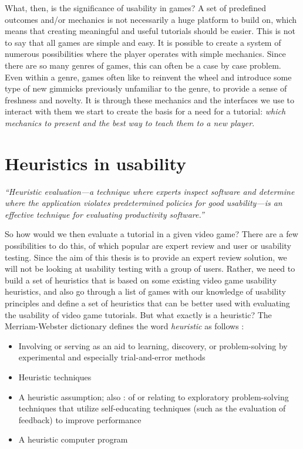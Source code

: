 What, then, is the significance of usability in games? A set of predefined outcomes and/or mechanics is not necessarily a huge platform to build on, which means that creating meaningful and useful tutorials should be easier. This is not to say that all games are simple and easy. It is possible to create a system of numerous possibilities where the player operates with simple mechanics. Since there are so many genres of games, this can often be a case by case problem. Even within a genre, games often like to reinvent the wheel and introduce some type of new gimmicks previously unfamiliar to the genre, to provide a sense of freshness and novelty. It is through these mechanics and the interfaces we use to interact with them we start to create the basis for a need for a tutorial: \textit{which mechanics to present and the best way to teach them to a new player}.

\section{Heuristics in usability}

\begin{displayquote}
	\textit{``Heuristic evaluation---a technique where experts inspect software and determine where the application violates predetermined policies for good usability---is an effective technique for evaluating productivity software.''} \cite{Livingston2010}
\end{displayquote}

So how would we then evaluate a tutorial in a given video game? There are a few possibilities to do this, of which popular are expert review and user or usability testing. Since the aim of this thesis is to provide an expert review solution, we will not be looking at usability testing with a group of users. Rather, we need to build a set of heuristics that is based on some existing video game usability heuristics, and also go through a list of games with our knowledge of usability principles and define a set of heuristics that can be better used with evaluating the usability of video game tutorials. But what exactly is a heuristic? The Merriam-Webster dictionary defines the word \textit{heuristic} as follows \cite{merriam2007}: 

\begin{itemize}
	\item Involving or serving as an aid to learning, discovery, or problem-solving by experimental and especially trial-and-error methods 
	\item Heuristic techniques 
	\item A heuristic assumption; also :  of or relating to exploratory problem-solving techniques that utilize self-educating techniques (such as the evaluation of feedback) to improve performance 
	\item A heuristic computer program 
	
\end{itemize}

